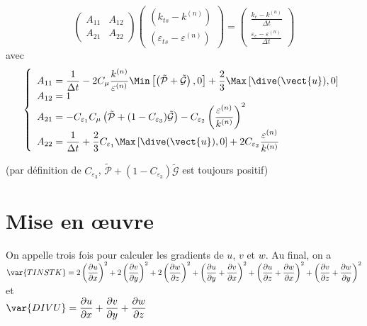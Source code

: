 \begin{equation}
\left(\begin{array}{cc}
A_{11}&A_{12}\\
A_{21}&A_{22}
\end{array}\right)
\left(\begin{array}{c}
(k_{ts}-k^{(n)})\\(\varepsilon_{ts}-\varepsilon^{(n)})
\end{array}\right)
=\left(\begin{array}{c}
\displaystyle\frac{k_e-k^{(n)}}{\Delta t}\\
\displaystyle\frac{\varepsilon_e-\varepsilon^{(n)}}{\Delta t}
\end{array}\right)
\end{equation}
avec
\begin{equation}
\left\{\begin{array}{l}
\displaystyle A_{11}=\frac{1}{\Delta t}
-2 C_\mu\frac{k^{(n)}}{\varepsilon^{(n)}}
\Min\left[\left(\tilde{\mathcal{P}}+\tilde{\mathcal{G}}\right),0\right]
+\frac{2}{3}\Max\left[\dive(\vect{u}),0\right]\\
\displaystyle A_{12}= 1\\
\displaystyle A_{21}=
- C_{\varepsilon_1} C_\mu \left(\tilde{\mathcal{P}}
+(1-C_{\varepsilon_3})\tilde{\mathcal{G}}\right)
- C_{\varepsilon_2}\left(\frac{\varepsilon^{(n)}}{k^{(n)}}\right)^2\\
\displaystyle A_{22}=\frac{1}{\Delta t}
+\frac{2}{3}C_{\varepsilon_1}\Max\left[\dive(\vect{u}),0\right]
+2 C_{\varepsilon_2}\frac{\varepsilon^{(n)}}{k^{(n)}}
\end{array}\right.
\end{equation}

(par d\'efinition de $C_{\varepsilon_3}$,
$\tilde{\mathcal{P}}+(1-C_{\varepsilon_3})\tilde{\mathcal{G}}$
est toujours positif)

\section{Mise en \oe uvre}

On appelle trois fois  pour calculer les gradients de $u$, $v$ et
$w$. Au final, on a \\
$\displaystyle \var{TINSTK}=
2\left(\frac{\partial u}{\partial x}\right)^2+
2\left(\frac{\partial v}{\partial y}\right)^2+
2\left(\frac{\partial w}{\partial z}\right)^2+
\left(\frac{\partial u}{\partial y}+\frac{\partial v}{\partial x}\right)^2+
\left(\frac{\partial u}{\partial z}+\frac{\partial w}{\partial x}\right)^2+
\left(\frac{\partial v}{\partial z}+\frac{\partial w}{\partial y}\right)^2$\\
et\\
$\displaystyle \var{DIVU}=
\frac{\partial u}{\partial x}+\frac{\partial v}{\partial y}
+\frac{\partial w}{\partial z}$

